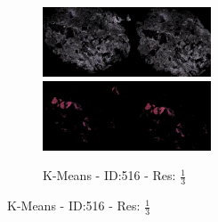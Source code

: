 \documentclass[a4paper,10pt,oneside]{article}
\begin{document}
\begin{figure}[hbtp]
\begin{subfigure}[b]{5cm}
    \includegraphics[width=5cm]{visualization/results/kmeans/res_reduce_5/Region_0_PO13-00516A1_1_7_201305171148.png}
    \includegraphics[width=5cm]{visualization/results/kmeans/res_reduce_5/Region_1_PO13-00516A1_1_7_201305171148.png}
    \caption{K-Means - ID:516 - Res: $\frac{1}{3}$}
  \end{subfigure}
  

\end{figure}
\end{document}
